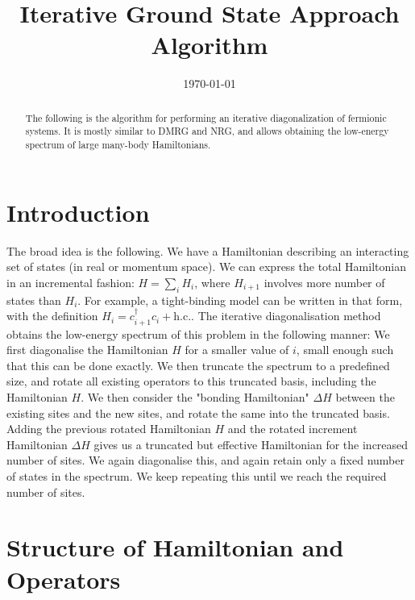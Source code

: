 \documentclass[reprint]{revtex4-2}
\begin{document}
\title{Iterative Ground State Approach Algorithm}
\begin{abstract}
	The following is the algorithm for performing an iterative diagonalization of fermionic systems. It is mostly similar to DMRG and NRG, and allows obtaining the low-energy spectrum of large many-body Hamiltonians.
\end{abstract}
\date{\today}
\maketitle

\section{Introduction}
The broad idea is the following. We have a Hamiltonian describing an interacting set of states (in real or momentum space). We can express the total Hamiltonian in an incremental fashion: \(H = \sum_i H_i\), where \(H_{i+1}\) involves more number of states than \(H_i\). For example, a tight-binding model can be written in that form, with the definition \(H_i = c^\dagger_{i+1}c_i + \text{h.c.}\). The iterative diagonalisation method obtains the low-energy spectrum of this problem in the following manner: We first diagonalise the Hamiltonian \(H\) for a smaller value of \(i\), small enough such that this can be done exactly. We then truncate the spectrum to a predefined size, and rotate all existing operators to this truncated basis, including the Hamiltonian \(H\). We then consider the "bonding Hamiltonian" \(\Delta H\) between the existing sites and the new sites, and rotate the same into the truncated basis. Adding the previous rotated Hamiltonian \(H\) and the rotated increment Hamiltonian \(\Delta H\) gives us a truncated but effective Hamiltonian for the increased number of sites. We again diagonalise this, and again retain only a fixed number of states in the spectrum. We keep repeating this until we reach the required number of sites.


\section{Structure of Hamiltonian and Operators}
\end{document}

